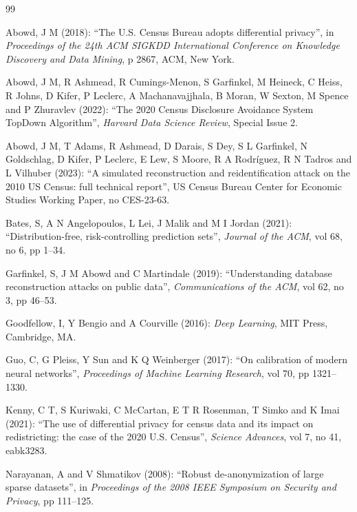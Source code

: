 \documentclass[11pt,a4paper]{article}
\theoremstyle{plain}
\theoremstyle{definition}
\begin{document}
\begin{thebibliography}{99}

Abowd, J M (2018): ``The U.S. Census Bureau adopts differential privacy'', in \emph{Proceedings of the 24th ACM SIGKDD International Conference on Knowledge Discovery and Data Mining}, p 2867, ACM, New York.

Abowd, J M, R Ashmead, R Cumings-Menon, S Garfinkel, M Heineck, C Heiss, R Johns, D Kifer, P Leclerc, A Machanavajjhala, B Moran, W Sexton, M Spence and P Zhuravlev (2022): ``The 2020 Census Disclosure Avoidance System TopDown Algorithm'', \emph{Harvard Data Science Review}, Special Issue 2.

Abowd, J M, T Adams, R Ashmead, D Darais, S Dey, S L Garfinkel, N Goldschlag, D Kifer, P Leclerc, E Lew, S Moore, R A Rodr\'iguez, R N Tadros and L Vilhuber (2023): ``A simulated reconstruction and reidentification attack on the 2010 US Census: full technical report'', US Census Bureau Center for Economic Studies Working Paper, no CES-23-63.

Bates, S, A N Angelopoulos, L Lei, J Malik and M I Jordan (2021): ``Distribution-free, risk-controlling prediction sets'', \emph{Journal of the ACM}, vol 68, no 6, pp 1--34.

Garfinkel, S, J M Abowd and C Martindale (2019): ``Understanding database reconstruction attacks on public data'', \emph{Communications of the ACM}, vol 62, no 3, pp 46--53.

Goodfellow, I, Y Bengio and A Courville (2016): \emph{Deep Learning}, MIT Press, Cambridge, MA.

Guo, C, G Pleiss, Y Sun and K Q Weinberger (2017): ``On calibration of modern neural networks'', \emph{Proceedings of Machine Learning Research}, vol 70, pp 1321--1330.

Kenny, C T, S Kuriwaki, C McCartan, E T R Rosenman, T Simko and K Imai (2021): ``The use of differential privacy for census data and its impact on redistricting: the case of the 2020 U.S. Census'', \emph{Science Advances}, vol 7, no 41, eabk3283.

Narayanan, A and V Shmatikov (2008): ``Robust de-anonymization of large sparse datasets'', in \emph{Proceedings of the 2008 IEEE Symposium on Security and Privacy}, pp 111--125.


\end{thebibliography}
\end{document}
